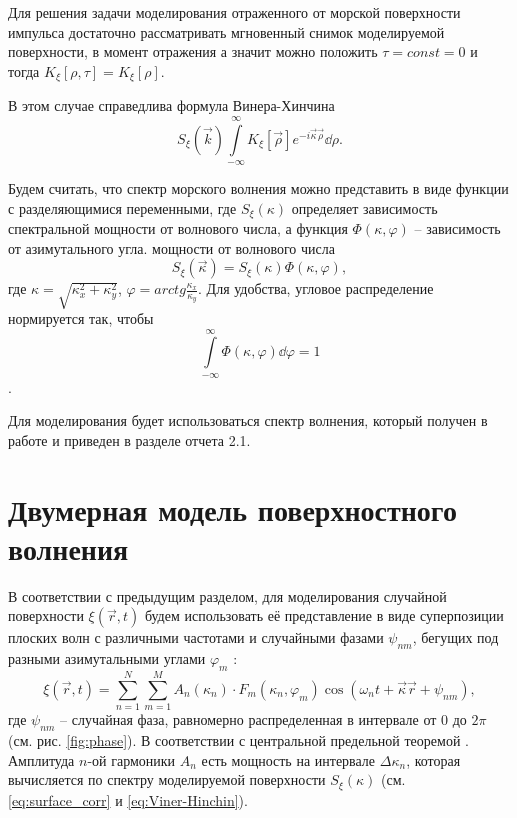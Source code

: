 \documentclass[a4paper,14pt]{extarticle}
\newcommand*{\const}{const}
\renewcommand*{\arctg}{arctg}
\renewcommand*{\phi}{\varphi}
\renewcommand{\qty}{ }
\begin{document}
Для решения задачи моделирования отраженного от морской поверхности импульса
достаточно рассматривать мгновенный снимок моделируемой поверхности, в момент
отражения
а значит можно положить $\tau = \const = 0$  и  тогда $K_\xi[\rho,\tau] = K_\xi [\rho]$.

В этом случае справедлива формула Винера-Хинчина \cite{cite:10}
\begin{equation}
    \label{eq:Viner-Hinchin}
    S_\xi(\vec k) \int\limits_{-\infty}^{\infty} K_\xi \qty[\vec \rho] e^{- i
    \vec \kappa \vec \rho} \dd \rho. 
\end{equation}


Будем считать, что спектр морского волнения можно представить в виде функции с
разделяющимися переменными, где $S_{\xi}(\kappa)$ определяет зависимость
спектральной мощности от волнового числа, а функция $\Phi(\kappa, \phi)$ -- 
зависимость от азимутального угла.
мощности от волнового числа
\begin{equation}
    S_\xi(\vec \kappa) = S_\xi(\kappa) \Phi(\kappa, \phi),
\end{equation}
где $\kappa = \sqrt{\kappa_x^2 + \kappa_y^2}$,  $\phi = \arctg
\frac{\kappa_x}{\kappa_y}$. Для
удобства, угловое распределение нормируется так, чтобы
$$\int\limits_{-\infty}^{\infty} \Phi(\kappa,\phi) \dd
\phi = 1$$.


Для моделирования будет использоваться спектр волнения, который получен в
работе \cite{cite:6} и приведен в разделе отчета 2.1.

\section{Двумерная модель поверхностного волнения}%
\label{sec:dvumernaia_model_poverkhnostnogo_volneniia}

В соответствии с предыдущим разделом, для моделирования случайной поверхности
$\xi(\vec r,t)$ будем использовать её представление в виде суперпозиции
плоских волн с различными частотами и случайными фазами $\psi_{nm}$, бегущих
под разными азимутальными углами $\phi_m$ \cite{cite:11}:
\begin{equation}
    \label{eq:surface2d}
    \xi(\vec r,t) = \sum\limits_{n=1}^{N} \sum\limits_{m=1}^{M}
    A_n(\kappa_n) \cdot
    F_m(\kappa_n,\phi_m) \cos \qty(\omega_n t + \vec \kappa \vec r + \psi_{nm}),
\end{equation}
где $\psi_{nm}$ -- случайная фаза, равномерно распределенная в интервале от $0$
до $2 \pi$ (см. рис. \ref{fig:phase}). В соответствии с
центральной предельной теоремой \cite{cite:7}. Амплитуда $n$-ой гармоники $A_n$ есть
мощность на интервале $\Delta \kappa_n$, которая вычисляется по спектру моделируемой
поверхности $S_\xi(\kappa)$ (см. \eqref{eq:surface_corr} и \eqref{eq:Viner-Hinchin}).
\end{document}
